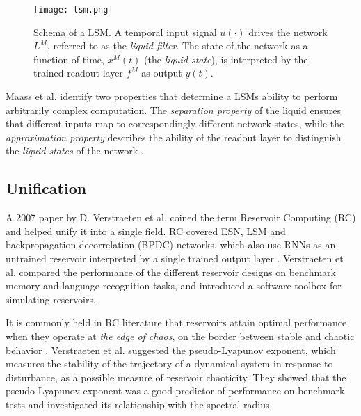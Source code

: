 \documentclass{article}
\begin{document}
     \begin{figure}[h!]
        \centering
            \texttt{[image: lsm.png]}
    \caption{ Schema of a LSM. A temporal input signal $u(\cdot)$ drives the 
	network $L^M$, referred to as the \textit{liquid filter}.  The state of 
	    the network as a function of time, $x^M(t)$ (the \textit{liquid 
		    state}), is interpreted by the trained readout layer $f^M$ 
	    as output $y(t)$. \cite{maass2002real}}
            \label{lsm_png}
            \end{figure}

     Maass et al. identify two properties that determine a LSMs ability to 
     perform arbitrarily complex computation. The \textit{separation property} 
     of the liquid ensures that  different inputs map to correspondingly 
     different network states, while the \textit{approximation property} 
     describes the ability of the readout layer to distinguish the 
     \textit{liquid states} of the network \cite{maass2002real}. \par
          
     \subsection{Unification}
     A 2007 paper by D.  Verstraeten et al.  \cite{verstraeten2007experimental} 
     coined the term Reservoir Computing (RC) and helped unify it into a single 
     field. RC covered ESN, LSM and backpropagation decorrelation (BPDC) 
    networks, which also use RNNs as an untrained reservoir interpreted by a 
    single trained output layer \cite{steil2004backpropagation}. Verstraeten et 
    al.  compared  the performance of the different reservoir designs  on 
    benchmark memory and language recognition tasks, and introduced a software 
    toolbox for simulating reservoirs. \par It is commonly held in RC 
    literature that reservoirs attain optimal performance when they operate at 
    \textit{the edge of chaos}, on the border between stable and chaotic 
    behavior \cite{verstraeten2007experimental}. Verstraeten et al. suggested 
    the pseudo-Lyapunov exponent, which measures the stability of the 
    trajectory of a dynamical system in response to disturbance, as a possible 
    measure of reservoir chaoticity. They showed that the pseudo-Lyapunov 
    exponent was a good predictor of performance on benchmark tests and 
    investigated its relationship with the spectral radius. 
   
\end{document}
